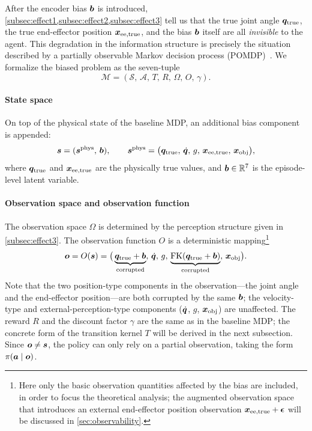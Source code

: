 After the encoder bias $\bm{b}$ is introduced, \cref{subsec:effect1,subsec:effect2,subsec:effect3} tell us that the true joint angle $\bm{q}_{\text{true}}$, the true end-effector position $\bm{x}_{\text{ee,true}}$, and the bias $\bm{b}$ itself are all \emph{invisible} to the agent. This degradation in the information structure is precisely the situation described by a partially observable Markov decision process (POMDP)~\cite{kaelbling1998planning}. We formalize the biased problem as the seven-tuple
\begin{equation}
  \mathcal{M} = (\mathcal{S},\,\mathcal{A},\,T,\,R,\,\Omega,\,O,\,\gamma).
  \label{eq:pomdp}
\end{equation}

\paragraph{State space} On top of the physical state of the baseline MDP, an additional bias component is appended:
\begin{equation}
  \bm{s} = (\bm{s}^{\text{phys}},\,\bm{b}), \qquad
  \bm{s}^{\text{phys}} = \big(\bm{q}_{\text{true}},\,\dot{\bm{q}},\,g,\,\bm{x}_{\text{ee,true}},\,\bm{x}_{\text{obj}}\big),
  \label{eq:state_pomdp}
\end{equation}
where $\bm{q}_{\text{true}}$ and $\bm{x}_{\text{ee,true}}$ are the physically true values, and $\bm{b} \in \mathbb{R}^7$ is the episode-level latent variable.

\paragraph{Observation space and observation function} The observation space $\Omega$ is determined by the perception structure given in \cref{subsec:effect3}. The observation function $O$ is a deterministic mapping\footnote{Here only the basic observation quantities affected by the bias are included, in order to focus the theoretical analysis; the augmented observation space that introduces an external end-effector position observation $\bm{x}_{\text{ee,true}} + \bm{\epsilon}$ will be discussed in \cref{sec:observability}.}
\begin{equation}
  \bm{o} = O(\bm{s}) = \big(\underbrace{\bm{q}_{\text{true}} + \bm{b}}_{\text{corrupted}},\,\dot{\bm{q}},\,g,\,\underbrace{\text{FK}(\bm{q}_{\text{true}} + \bm{b})}_{\text{corrupted}},\,\bm{x}_{\text{obj}}\big).
  \label{eq:obs_func}
\end{equation}
Note that the two position-type components in the observation---the joint angle and the end-effector position---are both corrupted by the same $\bm{b}$; the velocity-type and external-perception-type components ($\dot{\bm{q}}$, $g$, $\bm{x}_{\text{obj}}$) are unaffected. The reward $R$ and the discount factor $\gamma$ are the same as in the baseline MDP; the concrete form of the transition kernel $T$ will be derived in the next subsection. Since $\bm{o} \neq \bm{s}$, the policy can only rely on a partial observation, taking the form $\pi(\bm{a} \mid \bm{o})$.

